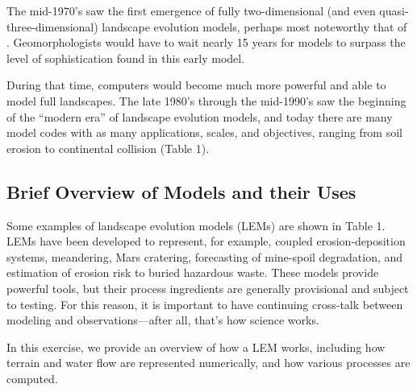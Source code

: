 \documentclass[12pt,reqno]{amsart}
\begin{document}
The mid-1970's saw the first emergence of fully two-dimensional (and
even quasi-three-dimensional) landscape evolution models, perhaps most
noteworthy that of \citet{ahnert1976}. Geomorphologists
would have to wait nearly 15 years for models to surpass the level of
sophistication found in this early model. 

During that time, computers would become much more powerful
and able to model full landscapes. The late 1980's through the
mid-1990's saw the beginning of the ``modern era'' of landscape
evolution models, and today there are many model codes with as many
applications, scales, and objectives, ranging from soil erosion to
continental collision (Table 1).

\subsection{Brief Overview of Models and their Uses}

Some examples of landscape evolution models (LEMs) are shown in Table
1. LEMs have been developed to represent, for example, coupled
erosion-deposition systems, meandering, Mars cratering, forecasting of
mine-spoil degradation, and estimation of erosion risk to buried
hazardous waste. These models provide powerful tools, but their
process ingredients are generally provisional and subject to
testing. For this reason, it is important to have continuing
cross-talk between modeling and observations---after all, that's how science works.

In this exercise, we provide an overview of how a LEM works, including
how terrain and water flow are represented numerically, and how various
processes are computed. 
\end{document}
